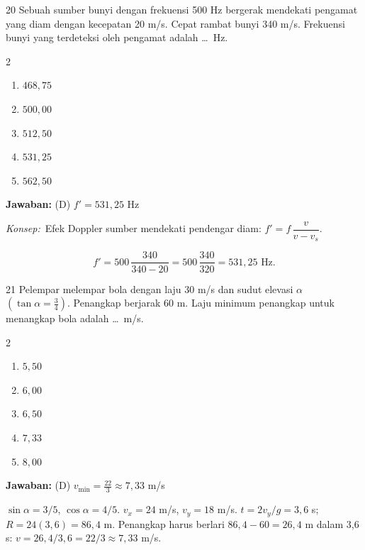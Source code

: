 \documentclass[11pt]{article}
\newcommand{\jawaban}[1]{%
  \noindent\colorbox{gold!30}{\parbox{\dimexpr\linewidth-2\fboxsep\relax}{%
    \textbf{Jawaban:} #1}}\par\smallskip}
\newcommand{\konsep}{\noindent\textit{Konsep:}\ \ignorespaces}
\newenvironment{pilB}{%
  \par\smallskip\begin{multicols}{2}
  \begin{enumerate}[label=(\Alph*),leftmargin=*,itemsep=1pt,topsep=3pt]}%
  {\end{enumerate}\end{multicols}}
\begin{document}
\begin{soal}{20}  %
Sebuah sumber bunyi dengan frekuensi 500 Hz bergerak mendekati
pengamat yang diam dengan kecepatan 20 m/s. Cepat rambat bunyi
340 m/s. Frekuensi bunyi yang terdeteksi oleh pengamat adalah
\ldots\ Hz.
\begin{pilB}
  \item $468{,}75$ \item $500{,}00$ \item $512{,}50$ \item $531{,}25$ \item $562{,}50$
\end{pilB}
\end{soal}
\begin{pembox}
\jawaban{(D) $f' = 531{,}25$ Hz}
\konsep Efek Doppler sumber mendekati pendengar diam: $f' = f\,\dfrac{v}{v - v_s}$.

\[ f' = 500\,\frac{340}{340-20} = 500\,\frac{340}{320} = 531{,}25 \text{ Hz}. \]
\end{pembox}


\begin{soal}{21}  %
Pelempar melempar bola dengan laju 30 m/s dan sudut elevasi $\alpha$
$\left(\tan\alpha=\tfrac{3}{4}\right)$. Penangkap berjarak 60 m.
Laju minimum penangkap untuk menangkap bola adalah \ldots\ m/s.
\begin{pilB}
  \item $5{,}50$ \item $6{,}00$ \item $6{,}50$ \item $7{,}33$ \item $8{,}00$
\end{pilB}
\end{soal}
\begin{pembox}
\jawaban{(D) $v_{\min} = \tfrac{22}{3} \approx 7{,}33$ m/s}
$\sin\alpha=3/5$, $\cos\alpha=4/5$.
$v_x = 24$ m/s, $v_y=18$ m/s.
$t = 2v_y/g = 3{,}6$ s; $R = 24(3{,}6)=86{,}4$ m.
Penangkap harus berlari $86{,}4-60=26{,}4$ m dalam 3,6 s:
$v = 26{,}4/3{,}6 = 22/3 \approx 7{,}33$ m/s.
\end{pembox}
\end{document}
